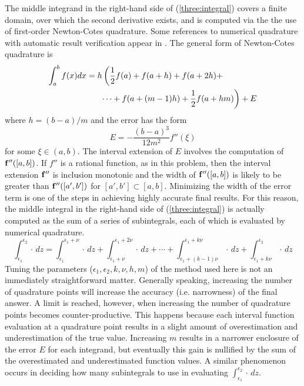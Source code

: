The middle integrand in the right-hand side of 
(\ref{three:integral}) covers a finite domain, over
which the second derivative exists, and is computed via the the use of 
first-order Newton-Cotes quadrature.  Some references to numerical quadrature
with automatic result verification appear in \cite{Kelch}.  The general form
of Newton-Cotes quadrature is
\begin{eqnarray}
\lefteqn{
\int_a^b f(x) dx = h\left(\frac{1}{2}f(a) + f(a+h) + f(a+2h) + \right.}
\hspace{3.5in} \nonumber \\
\left. \cdots + f(a+(m-1)h)
+ \frac{1}{2}f(a+hm)\right) + E
\end{eqnarray}
where $h = (b-a)/m$ and the error has the form 
$$E = - \frac{(b-a)^3}{12m^2} f''(\xi)$$
for some $\xi \in (a,b)$.
The interval extension of $E$ involves the computation of 
${\bf f}''([a,b])$.  If $f''$ is a rational function, as in this problem, 
then the interval
extension ${\bf f}''$ is inclusion monotonic and the width of 
${\bf f}''([a,b])$ is likely to be greater than ${\bf f}''([a',b'])$ for
$[a',b'] \subset [a,b]$.  Minimizing the width of the error term is one
of the steps in achieving highly accurate final results.
For this reason, the middle integral in the right-hand side of
(\ref{three:integral})  is actually computed as the sum
of a series of subintegrals, each of which is evaluated by numerical
quadrature.
\begin{equation}
\int_{\epsilon _1}^{\epsilon _2} \cdot \, dz = 
  \int_{\epsilon _1}^{\epsilon _1+\nu} \cdot \, dz
 +\int_{\epsilon _1+\nu}^{\epsilon _1+2\nu} \cdot \, dz
 + \cdots + \int_{\epsilon _1+(k-1)\nu}^{\epsilon _1+k\nu} \cdot \, dz
 + \int_{\epsilon _1+k\nu}^{\epsilon _2} \cdot \, dz
\end{equation}
Tuning the parameters ($\epsilon_1, \epsilon_2, k, \nu, h, m$)
of the method used here is not an immediately
straightforward matter.
Generally speaking, increasing the number of quadrature points will increase
the accuracy (i.e. narrowness) of the final answer.  A limit is reached,
however, when increasing the number of quadrature points becomes
counter-productive.  This happens because each interval
function evaluation at a
quadrature point results in a slight amount of overestimation and
underestimation of the true value.  Increasing $m$ results in a narrower
enclosure of the error $E$ for each integrand, 
but eventually this gain is nullified by the sum
of the overestimated and underestimated function values.
A similar phenomenon occurs in deciding how many subintegrals to use in
evaluating $\int_{\epsilon_1}^{\epsilon_2} \cdot\, dz$.
  
